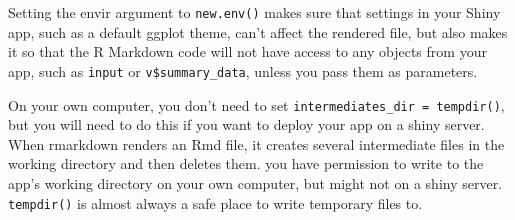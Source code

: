\documentclass[
  oneside]{book}
\newenvironment{Shaded}{\begin{snugshade}}{\end{snugshade}}
\newcommand{\AttributeTok}[1]{\textcolor[rgb]{0.77,0.63,0.00}{#1}}
\newcommand{\ControlFlowTok}[1]{\textcolor[rgb]{0.13,0.29,0.53}{\textbf{#1}}}
\newcommand{\DocumentationTok}[1]{\textcolor[rgb]{0.56,0.35,0.01}{\textbf{\textit{#1}}}}
\newcommand{\FunctionTok}[1]{\textcolor[rgb]{0.00,0.00,0.00}{#1}}
\newcommand{\NormalTok}[1]{#1}
\newcommand{\OtherTok}[1]{\textcolor[rgb]{0.56,0.35,0.01}{#1}}
\newcommand{\SpecialCharTok}[1]{\textcolor[rgb]{0.00,0.00,0.00}{#1}}
\newcommand{\StringTok}[1]{\textcolor[rgb]{0.31,0.60,0.02}{#1}}
\begin{document}
\begin{Shaded}
\end{Shaded}

Setting the \AttributeTok{envir} argument to \texttt{new.env}\texttt{()} makes sure that settings in your Shiny app, such as a default ggplot theme, can't affect the rendered file, but also makes it so that the R Markdown code will not have access to any objects from your app, such as \texttt{input} or \texttt{v\$summary\_data}, unless you pass them as parameters.

\begin{dangerous}
On your own computer, you don't need to set \texttt{intermediates\_dir\ =\ tempdir()}, but you will need to do this if you want to deploy your app on a shiny server. When rmarkdown renders an Rmd file, it creates several intermediate files in the working directory and then deletes them. you have permission to write to the app's working directory on your own computer, but might not on a shiny server. \texttt{tempdir}\texttt{()} is almost always a safe place to write temporary files to.

\end{dangerous}
\end{document}
